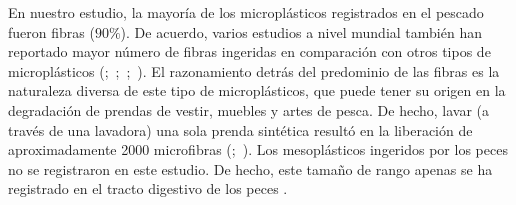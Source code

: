 En nuestro estudio, la mayoría de los microplásticos registrados en el pescado fueron fibras ($90\%$). De acuerdo, varios estudios a nivel mundial también han reportado mayor número de fibras ingeridas en comparación con otros tipos de microplásticos (\cite{NEVES2015119};~\cite{BELLAS201655};~\cite{NADAL2016517};~\cite{PAZOS201785}). El razonamiento detrás del predominio de las fibras es la naturaleza diversa de este tipo de microplásticos, que puede tener su origen en la degradación de prendas de vestir, muebles y artes de pesca. De hecho, lavar (a través de una lavadora) una sola prenda sintética resultó en la liberación de aproximadamente 2000 microfibras (\cite{AnthonyBrowne2011};~\cite{CarneyAlmroth}). Los mesoplásticos ingeridos por los peces no se registraron en este estudio. De hecho, este tamaño de rango apenas se ha registrado en el tracto digestivo de los peces \parencite{JABEEN2017141}.

